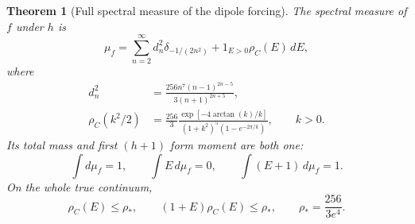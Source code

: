 \documentclass[11pt]{article}
\numberwithin{equation}{section}
\newtheorem{theorem}{Theorem}[section]
\theoremstyle{definition}
\theoremstyle{remark}
\begin{document}
\begin{theorem}[Full spectral measure of the dipole forcing]
\label{p4h:thm:spectral}
The spectral measure of $f$ under $h$ is
\begin{equation}\label{p4h:eq:measure}
 \mu_f=\sum_{n=2}^\infty d_n^2\delta_{-1/(2n^2)}
                       +1_{E>0}\rho_C(E)\,dE,
\end{equation}
where
\begin{align}
 d_n^2&=\frac{256n^7(n-1)^{2n-5}}{3(n+1)^{2n+5}},
 \label{p4h:eq:atoms}\\
 \rho_C(k^2/2)&=\frac{256}{3}
 \frac{\exp[-4\arctan(k)/k]}
 {(1+k^2)^5(1-e^{-2\pi/k})},\qquad k>0 .
 \label{p4h:eq:continuumdensity}
\end{align}
Its total mass and first $(h+1)$ form moment are both one:
\begin{equation}\label{p4h:eq:sumrules}
 \int d\mu_f=1,\qquad \int E\,d\mu_f=0,\qquad
                    \int(E+1)\,d\mu_f=1 .
\end{equation}
On the whole true continuum,
\begin{equation}\label{p4h:eq:densityceiling}
 \rho_C(E)\leq\rho_*,\qquad
 (1+E)\rho_C(E)\leq\rho_*,
 \qquad \rho_*=\frac{256}{3e^4}.
\end{equation}
\end{theorem}
\end{document}

